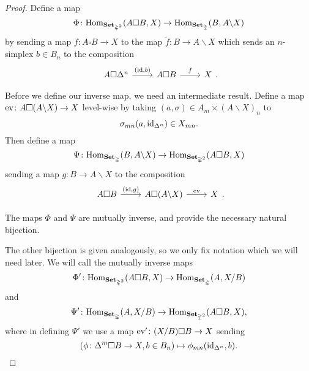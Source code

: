 \documentclass[main.tex]{subfiles}
\begin{document}
\begin{appendix}
\begin{proof}
    Define a map
    \begin{equation*}
      \Phi\colon \mathrm{Hom}_{\mathbf{Set}_{\mathbb{\Delta}^{2}}}(A \square B, X) \to \mathrm{Hom}_{\mathbf{Set}_{\mathbb{\Delta}}}(B, A \backslash X)
    \end{equation*}
    by sending a map $f\colon A \square B \to X$ to the map $\tilde{f}\colon B \to A \backslash X$ which sends an $n$-simplex $b \in B_{n}$ to the composition
    \begin{equation*}
      \begin{tikzcd}
        A \square \Delta^{n}
        \arrow[r, "{(\id, b)}"]
        & A \square B
        \arrow[r, "f"]
        & X
      \end{tikzcd}.
    \end{equation*}

    Before we define our inverse map, we need an intermediate result. Define a map $\mathrm{ev}\colon A \square (A \backslash X) \to X$ level-wise by taking $(a, \sigma) \in A_{m} \times (A \backslash X)_{n}$ to
    \begin{equation*}
      \sigma_{mn}(a, \mathrm{id}_{\Delta^{n}}) \in X_{mn}.
    \end{equation*}
    Then define a map
    \begin{equation*}
      \Psi\colon \mathrm{Hom}_{\mathbf{Set}_{\mathbb{\Delta}}}(B, A \backslash X) \to \mathrm{Hom}_{\mathbf{Set}_{\mathbb{\Delta}^{2}}}(A \square B, X)
    \end{equation*}
    sending a map $g\colon B \to A \backslash X$ to the composition
    \begin{equation*}
      \begin{tikzcd}
        A \square B
        \arrow[r, "{(\id, g)}"]
        & A \square (A \backslash X)
        \arrow[r, "\ev"]
        & X
      \end{tikzcd}.
    \end{equation*}

    The maps $\Phi$ and $\Psi$ are mutually inverse, and provide the necessary natural bijection.

    The other bijection is given analogously, so we only fix notation which we will need later. We will call the mutually inverse maps
    \begin{equation*}
      \Phi'\colon \mathrm{Hom}_{\mathbf{Set}_{\mathbb{\Delta}^{2}}}(A \square B, X) \to \mathrm{Hom}_{\mathbf{Set}_{\mathbb{\Delta}}}(A, X / B)
    \end{equation*}
    and
    \begin{equation*}
      \Psi'\colon \mathrm{Hom}_{\mathbf{Set}_{\mathbb{\Delta}}}(A, X / B) \to \mathrm{Hom}_{\mathbf{Set}_{\mathbb{\Delta}^{2}}}(A \square B, X),
    \end{equation*}
    where in defining $\Psi'$ we use a map $\mathrm{ev}'\colon (X / B) \square B \to X$ sending
    \begin{equation*}
      (\phi\colon \Delta^{m} \square B \to X, b \in B_{n}) \mapsto \phi_{mn}(\mathrm{id}_{\Delta^{n}}, b).
    \end{equation*}
  \end{proof}


\end{appendix}
\end{document}
